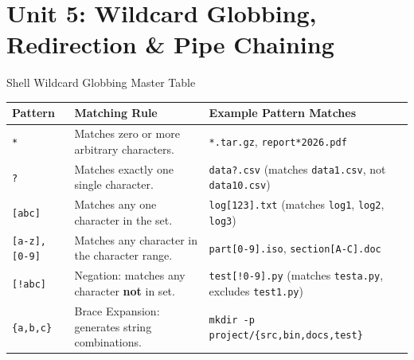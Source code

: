\chapter{Unit 5: Wildcard Globbing, Redirection \& Pipe Chaining}

\begin{cheatbox}{Shell Wildcard Globbing Master Table}
\begin{tabularx}{\linewidth}{l X l}
\toprule
\textbf{Pattern} & \textbf{Matching Rule} & \textbf{Example Pattern Matches} \\
\midrule
\texttt{*} & Matches zero or more arbitrary characters. & \texttt{*.tar.gz}, \texttt{report*2026.pdf} \\
\texttt{?} & Matches exactly one single character. & \texttt{data?.csv} (matches \texttt{data1.csv}, not \texttt{data10.csv}) \\
\texttt{[abc]} & Matches any one character in the set. & \texttt{log[123].txt} (matches \texttt{log1}, \texttt{log2}, \texttt{log3}) \\
\texttt{[a-z], [0-9]} & Matches any character in the character range. & \texttt{part[0-9].iso}, \texttt{section[A-C].doc} \\
\texttt{[!abc]} & Negation: matches any character \textbf{not} in set. & \texttt{test[!0-9].py} (matches \texttt{testa.py}, excludes \texttt{test1.py}) \\
\texttt{\{a,b,c\}} & Brace Expansion: generates string combinations. & \texttt{mkdir -p project/\{src,bin,docs,test\}} \\
\bottomrule
\end{tabularx}
\end{cheatbox}

